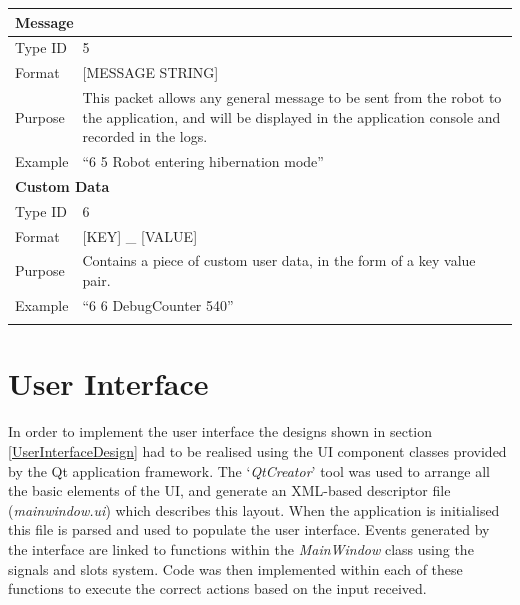 \begin{longtable}{ l p{12cm} }
 \hline
 \multicolumn{2}{p{12cm}}{\textbf{Message}}\\
 \hline
 Type ID & 5 \\
 Format & [MESSAGE STRING]\\
 Purpose & This packet allows any general message to be sent from the robot to the application, and will be displayed in the application console and recorded in the logs. \\
 Example & ``6 5 Robot entering hibernation mode''\\
 
 \hline
 \multicolumn{2}{p{12cm}}{\textbf{Custom Data}}\\
 \hline
 Type ID & 6 \\
 Format & [KEY] \_ [VALUE]\\
 Purpose & Contains a piece of custom user data, in the form of a key value pair. \\
 Example & ``6 6 DebugCounter 540''\\
	
 \label{tab:DataFormat}
\end{longtable}


\section{User Interface} \label{UserInterfaceImplementation}
In order to implement the user interface the designs shown in section \ref{UserInterfaceDesign} had to be realised using the UI component classes provided by the Qt application framework. The `\textit{QtCreator}' tool was used to arrange all the basic elements of the UI, and generate an XML-based descriptor file (\textit{mainwindow.ui}) which describes this layout. When the application is initialised this file is parsed and used to populate the user interface. Events generated by the interface are linked to functions within the \textit{MainWindow} class using the signals and slots system. Code was then implemented within each of these functions to execute the correct actions based on the input received.

